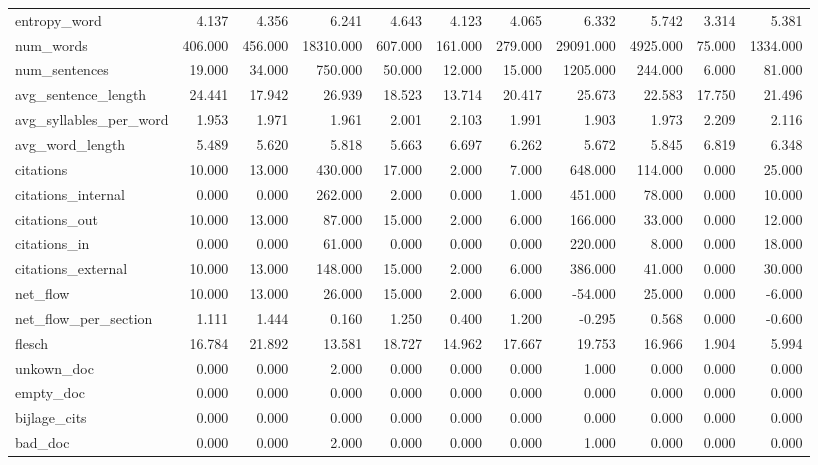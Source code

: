 \begin{tabular}{lrrrrrrrrrr}
\cline{1-11}
entropy\_word & 4.137 & 4.356 & 6.241 & 4.643 & 4.123 & 4.065 & 6.332 & 5.742 & 3.314 & 5.381 \\
\cline{1-11}
num\_words & 406.000 & 456.000 & 18310.000 & 607.000 & 161.000 & 279.000 & 29091.000 & 4925.000 & 75.000 & 1334.000 \\
\cline{1-11}
num\_sentences & 19.000 & 34.000 & 750.000 & 50.000 & 12.000 & 15.000 & 1205.000 & 244.000 & 6.000 & 81.000 \\
\cline{1-11}
avg\_sentence\_length & 24.441 & 17.942 & 26.939 & 18.523 & 13.714 & 20.417 & 25.673 & 22.583 & 17.750 & 21.496 \\
\cline{1-11}
avg\_syllables\_per\_word & 1.953 & 1.971 & 1.961 & 2.001 & 2.103 & 1.991 & 1.903 & 1.973 & 2.209 & 2.116 \\
\cline{1-11}
avg\_word\_length & 5.489 & 5.620 & 5.818 & 5.663 & 6.697 & 6.262 & 5.672 & 5.845 & 6.819 & 6.348 \\
\cline{1-11}
citations & 10.000 & 13.000 & 430.000 & 17.000 & 2.000 & 7.000 & 648.000 & 114.000 & 0.000 & 25.000 \\
\cline{1-11}
citations\_internal & 0.000 & 0.000 & 262.000 & 2.000 & 0.000 & 1.000 & 451.000 & 78.000 & 0.000 & 10.000 \\
\cline{1-11}
citations\_out & 10.000 & 13.000 & 87.000 & 15.000 & 2.000 & 6.000 & 166.000 & 33.000 & 0.000 & 12.000 \\
\cline{1-11}
citations\_in & 0.000 & 0.000 & 61.000 & 0.000 & 0.000 & 0.000 & 220.000 & 8.000 & 0.000 & 18.000 \\
\cline{1-11}
citations\_external & 10.000 & 13.000 & 148.000 & 15.000 & 2.000 & 6.000 & 386.000 & 41.000 & 0.000 & 30.000 \\
\cline{1-11}
net\_flow & 10.000 & 13.000 & 26.000 & 15.000 & 2.000 & 6.000 & -54.000 & 25.000 & 0.000 & -6.000 \\
\cline{1-11}
net\_flow\_per\_section & 1.111 & 1.444 & 0.160 & 1.250 & 0.400 & 1.200 & -0.295 & 0.568 & 0.000 & -0.600 \\
\cline{1-11}
flesch & 16.784 & 21.892 & 13.581 & 18.727 & 14.962 & 17.667 & 19.753 & 16.966 & 1.904 & 5.994 \\
\cline{1-11}
unkown\_doc & 0.000 & 0.000 & 2.000 & 0.000 & 0.000 & 0.000 & 1.000 & 0.000 & 0.000 & 0.000 \\
\cline{1-11}
empty\_doc & 0.000 & 0.000 & 0.000 & 0.000 & 0.000 & 0.000 & 0.000 & 0.000 & 0.000 & 0.000 \\
\cline{1-11}
bijlage\_cits & 0.000 & 0.000 & 0.000 & 0.000 & 0.000 & 0.000 & 0.000 & 0.000 & 0.000 & 0.000 \\
\cline{1-11}
bad\_doc & 0.000 & 0.000 & 2.000 & 0.000 & 0.000 & 0.000 & 1.000 & 0.000 & 0.000 & 0.000 \\
\cline{1-11}
\bottomrule
\end{tabular}
